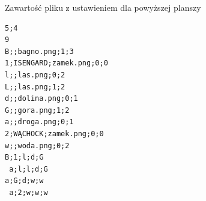 \documentclass[a4paper, 11pt]{article}
\begin{document}
Zawartość pliku z ustawieniem dla powyższej planszy
\begin{verbatim}
5;4
9
B;;bagno.png;1;3
1;ISENGARD;zamek.png;0;0
l;;las.png;0;2
L;;las.png;1;2
d;;dolina.png;0;1
G;;gora.png;1;2
a;;droga.png;0;1
2;WĄCHOCK;zamek.png;0;0
w;;woda.png;0;2
B;1;l;d;G
 a;l;l;d;G
a;G;d;w;w
 a;2;w;w;w	
\end{verbatim}
\end{document}
